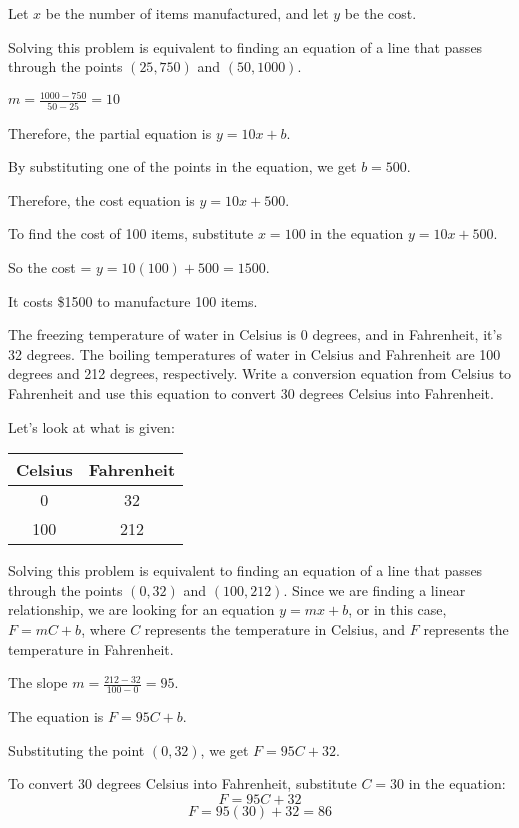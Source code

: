 \begin{solution}
Let $x$ be the number of items manufactured, and let $y$ be the cost.

Solving this problem is equivalent to finding an equation of a line that passes through the points $(25, 750)$ and $(50, 1000)$.  

$m = \frac{1000 - 750}{50 - 25} = 10$

Therefore, the partial equation is $y = 10x + b$.

By substituting one of the points in the equation, we get $b = 500$.

Therefore, the cost equation is $y = 10x + 500$.

To find the cost of 100 items, substitute $x = 100$ in the equation $y = 10x + 500$.

So the cost = $y = 10(100) + 500 = 1500$.

It costs \$1500 to manufacture 100 items.
\end{solution}

\begin{example}
The freezing temperature of water in Celsius is 0 degrees, and in Fahrenheit, it's 32 degrees. The boiling temperatures of water in Celsius and Fahrenheit are 100 degrees and 212 degrees, respectively. Write a conversion equation from Celsius to Fahrenheit and use this equation to convert 30 degrees Celsius into Fahrenheit.
\end{example}

\begin{solution}
Let's look at what is given:

\begin{center}
\begin{tabular}{|c|c|}
\hline
Celsius & Fahrenheit \\
\hline
0 & 32 \\
100 & 212 \\
\hline
\end{tabular}
\end{center}

Solving this problem is equivalent to finding an equation of a line that passes through the points $(0, 32)$ and $(100, 212)$. Since we are finding a linear relationship, we are looking for an equation $y = mx + b$, or in this case, $F = mC + b$, where $C$ represents the temperature in Celsius, and $F$ represents the temperature in Fahrenheit.

The slope $m = \frac{212 - 32}{100 - 0} = 95$.

The equation is $F = 95C + b$.

Substituting the point $(0, 32)$, we get $F = 95C + 32$.

To convert 30 degrees Celsius into Fahrenheit, substitute $C = 30$ in the equation:
\[F = 95C + 32\]
\[F = 95(30) + 32 = 86\]
\end{solution}

